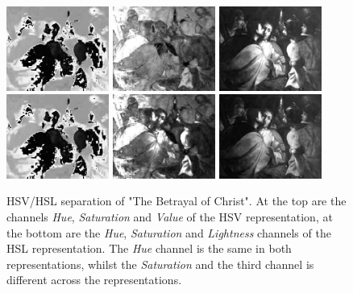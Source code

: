 \documentclass[11pt,a4paper,twoside,openright,draft]{report}
\begin{document}
\begin{multicols}{2}
\begin{figure}[tbp]
\centering
\includegraphics[width=0.30\textwidth]{H_caravaggio_1962_139_1}
\includegraphics[width=0.30\textwidth]{SHSV_caravaggio_1962_139_1}
\includegraphics[width=0.30\textwidth]{V_caravaggio_1962_139_1}
\includegraphics[width=0.30\textwidth]{H_caravaggio_1962_139_1}
\includegraphics[width=0.30\textwidth]{SHSL_caravaggio_1962_139_1}
\includegraphics[width=0.30\textwidth]{L_caravaggio_1962_139_1}
\caption[HSV/HSL separation]{HSV/HSL separation of "The Betrayal of Christ".
At the top are the channels \emph{Hue}, \emph{Saturation} and \emph{Value} of
the HSV representation, at the bottom are the \emph{Hue}, \emph{Saturation} and
\emph{Lightness} channels of the HSL representation.  The \emph{Hue} channel is
the same in both representations, whilst the \emph{Saturation} and the third
channel is different across the representations.}
\label{fig:hsvl}
\end{figure}


\end{multicols}
\end{document}
